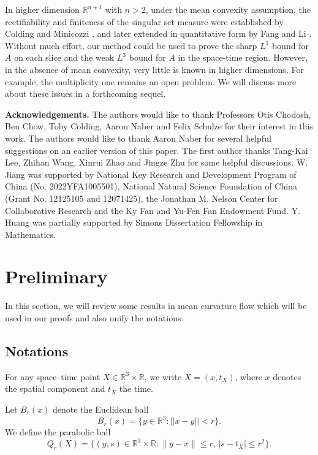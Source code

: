 \documentclass[11pt,reqno]{amsart}
\numberwithin{equation}{section}
\newcommand{\RR}{\mathds{R}}
\theoremstyle{definition}
\theoremstyle{remark}
\theoremstyle{remark}
\theoremstyle{remark}
\theoremstyle{remark}\newtheorem{conjecture}[equation]{Conjecture}
\theoremstyle{remark}\newtheorem{question}[equation]{Question}
\begin{document}
In higher dimension $\RR^{n+1}$ with $n > 2$, under the mean convexity assumption, the rectifiability and finiteness of the singular set measure were established by Colding and Minicozzi \cite{CM16}, and later extended in quantitative form by Fang and Li \cite{FL25}. Without much effort, our method could be used to prove the sharp $L^1$ bound for $A$ on each slice and the weak $L^3$ bound for $A$ in the space-time region. However, in the absence of mean convexity, very little is known in higher dimensions. For example, the multiplicity one remains an open problem. We will discuss more about these issues in a forthcoming sequel. 













\textbf{Acknowledgements.}  
The authors would like to thank  Professors Otis Chodosh, Ben Chow, Toby Colding,  Aaron Naber and  Felix Schulze for their interest in this work. The authors would like to thank Aaron Naber for several helpful suggestions on an earlier version of this paper. The first author thanks Tang-Kai Lee, Zhihan Wang, Xinrui Zhao and Jingze Zhu for some helpful discussions. 
W. Jiang was supported by National Key Research and Development Program of China (No. 2022YFA1005501), National Natural Science Foundation of China (Grant No. 12125105 and 12071425), the Jonathan M. Nelson Center for Collaborative Research and the Ky Fan and Yu-Fen Fan Endowment Fund. Y. Huang was partially supported by Simons Dissertation Fellowship in Mathematics.





\section{Preliminary}
In this section, we will review some results in mean curvature flow which will be used in our proofs and also unify the notations. 

\subsection{Notations}


For any space–time point $X \in \mathbb{R}^3 \times \mathbb{R}$, we write $X = (x, t_X)$, where $x$ denotes the spatial component and $t_X$ the time.  

Let $B_r(x)$ denote the Euclidean ball
\[
B_r(x) = \{ y \in \mathbb{R}^3 : ||x - y|| < r \}.
\]
We define the parabolic ball
\[
Q_r(X) = \{ (y,s) \in \mathbb{R}^3 \times \mathbb{R} : \|y - x\| \le r,\, |s - t_X| \le r^2 \}.
\]
\end{document}
